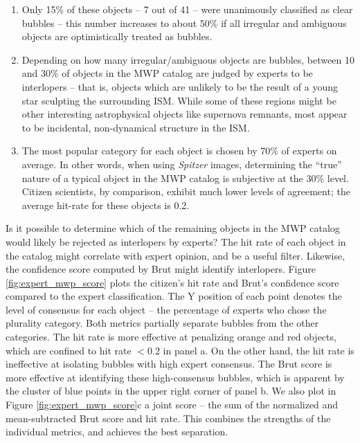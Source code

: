\begin{enumerate}
\item Only 15\% of these objects -- 7 out of 41 -- were unanimously classified as clear bubbles -- this number increases to about 50\% if all irregular and ambiguous objects are optimistically treated as bubbles.
\item Depending on how many irregular/ambiguous objects are bubbles, between 10 and 30\% of objects in the MWP catalog are judged by experts to be interlopers -- that is, objects which are unlikely to be the result of a young star sculpting the surrounding ISM. While some of these regions might be other interesting astrophysical objects like supernova remnants, most appear to be incidental, non-dynamical structure in the ISM.
\item The most popular category for each object is chosen by 70\% of experts on average. In other words, when using \emph{Spitzer} images, determining the ``true'' nature of a typical object in the MWP catalog is subjective at the 30\% level. Citizen scientists, by comparison, exhibit much lower levels of agreement; the average hit-rate for these objects is 0.2.
\end{enumerate}

Is it possible to determine which of the remaining objects in the MWP catalog would likely be rejected as interlopers by experts? The hit rate of each object in the catalog might correlate with expert opinion, and be a useful filter. Likewise, the confidence score computed by Brut might identify interlopers. Figure \ref{fig:expert_mwp_score} plots the citizen's hit rate and Brut's confidence score compared to the expert classification. The Y position of each point denotes the level of consensus for each object -- the percentage of experts who chose the plurality category. Both metrics partially separate bubbles from the other categories. The hit rate is more effective at penalizing orange and red objects, which are confined to hit rate $<0.2$ in panel a. On the other hand, the hit rate is ineffective at isolating bubbles with high expert consensus. The Brut score is more effective at identifying these high-consensus bubbles, which is apparent by the cluster of blue points in the upper right corner of panel b. We also plot in Figure \ref{fig:expert_mwp_score}c a joint score -- the sum of the normalized and mean-subtracted Brut score and hit rate.  This combines the strengths of the individual metrics, and achieves the best separation.

